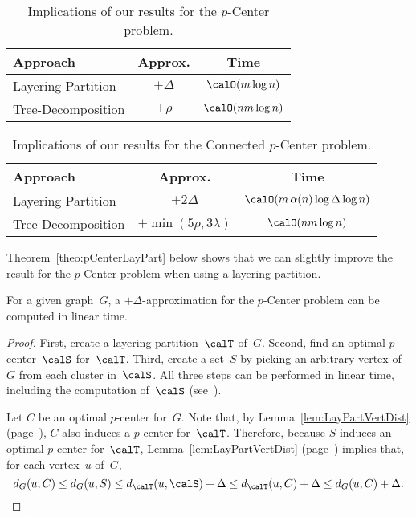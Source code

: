 \begin{table}
    [htb]
    \centering
    \caption
    {%
        Implications of our results for the $p$-Center problem.
    }
    \label{tbl:pCenterResults}
%
    \def\arraystretch{1.25}
    \begin{tabular}{lcc}
        \hline
        Approach
            & Approx.
            & Time \\
        \hline
        Layering Partition
            & $+ \Delta$
            & $\calO(m \log n)$ \\
        Tree-Decomposition
            & $+ \rho$
            & $\calO(nm \log n)$ \\
        \hline
    \end{tabular}
\end{table}

\begin{table}
    [htb]
    \centering
    \caption
    {%
        Implications of our results for the Connected $p$-Center problem.
    }
    \label{tbl:ConPCenterResults}
%
    \def\arraystretch{1.25}
    \begin{tabular}{lcc}
        \hline
        Approach
            & Approx.
            & Time \\
        \hline
        Layering Partition
            & $+ 2 \Delta$
            & $\calO(m \, \alpha(n) \log \Delta \log n)$ \\
        Tree-Decomposition
            & $+ \min (5 \rho, 3 \lambda)$
            & $\calO(nm \log n)$ \\
        \hline
    \end{tabular}
\end{table}

Theorem~\ref{theo:pCenterLayPart} below shows that we can slightly improve the result for the $p$-Center problem when using a layering partition.

\begin{theorem}
    \label{theo:pCenterLayPart}
For a given graph~\( G \), a \( + \Delta \)-approximation for the \( p \)-Center problem can be computed in linear time.
\end{theorem}

\begin{proof}
First, create a layering partition~$\calT$ of~$G$.
Second, find an optimal $p$-center~$\calS$ for~$\calT$.
Third, create a set~$S$ by picking an arbitrary vertex of~$G$ from each cluster in~$\calS$.
All three steps can be performed in linear time, including the computation of~$\calS$ (see~\cite{Frederickson1991}).

Let $C$ be an optimal $p$-center for~$G$.
Note that, by Lemma~\ref{lem:LayPartVertDist} (page~\pageref{lem:LayPartVertDist}), $C$ also induces a $p$-center for~$\calT$.
Therefore, because $S$ induces an optimal $p$-center for~$\calT$, Lemma~\ref{lem:LayPartVertDist} (page~\pageref{lem:LayPartVertDist}) implies that, for each vertex~$u$ of~$G$,
\[
    d_G(u, C) \leq d_G(u, S) \leq d_\calT(u, \calS) + \Delta \leq d_\calT(u, C) + \Delta \leq d_G(u, C) + \Delta.
    \qedhere
\]
\end{proof}

